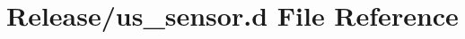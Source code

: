 \hypertarget{us__sensor_8d}{}\section{Release/us\+\_\+sensor.d File Reference}
\label{us__sensor_8d}
